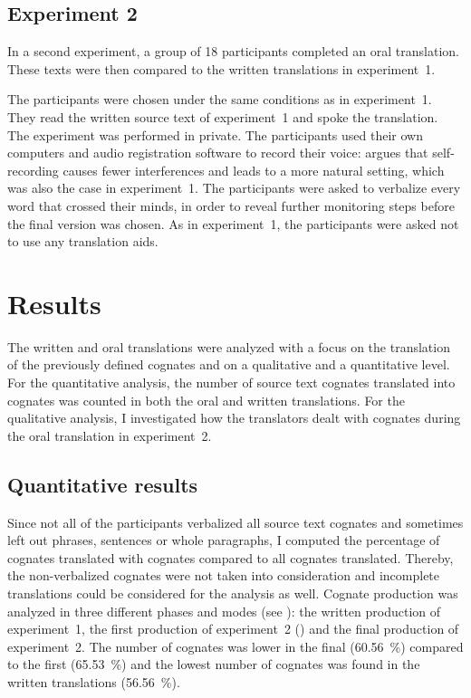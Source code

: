 \documentclass[output=paper]{LSP/langsci}
\begin{document}
\subsection{Experiment 2}\label{oster:sec:2.2}
In a second experiment, a group of 18 participants completed an oral translation. These texts were then compared to the written translations in experiment~1. 

\newpage
The participants were chosen under the same conditions as in experiment~1. They read the written source text of experiment~1 and spoke the translation. The experiment was performed in private. The participants used their own computers and audio registration software to record their voice: \citet{Whyatt2010} argues that self-recording causes fewer interferences and leads to a more natural setting, which was also the case in experiment~1. The participants were asked to verbalize every word that crossed their minds, in order to reveal further monitoring steps before the final version was chosen. As in experiment~1, the participants were asked not to use any translation aids.

\section{Results}\label{oster:sec:3}
The written and oral translations were analyzed with a focus on the translation of the previously defined cognates and on a qualitative and a quantitative level. For the quantitative analysis, the number of source text cognates translated into  cognates was counted in both the oral and written translations. For the qualitative analysis, I investigated how the translators dealt with cognates during the oral translation in experiment~2.

\subsection{Quantitative results}\label{oster:sec:3.1}
Since not all of the participants verbalized all source text cognates and sometimes left out phrases, sentences or whole paragraphs, I computed the percentage of cognates translated with cognates compared to all cognates translated. Thereby, the non-verbalized cognates were not taken into consideration and incomplete translations could be considered for the analysis as well. Cognate production was analyzed in three different phases and modes (see ): the written production of experiment~1, the first production of experiment~2 () and the final production of experiment~2. The number of cognates was lower in the final  (60.56~\%) compared to the first  (65.53~\%) and the lowest number of cognates was found in the written translations (56.56~\%).
\end{document}
